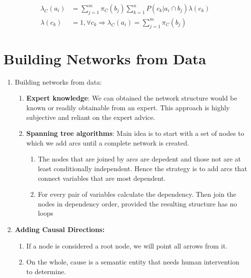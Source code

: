 \documentclass[12pt,twoside]{article}
\begin{document}
\begin{enumerate}
\begin{itemize}
\begin{align*}
\lambda_C(a_i)& = \sum_{j=1}^m \pi_C (b_j) \sum_{k=1}^n P(c_k \vert a_i \cap b_j) \lambda(c_k)\\
\lambda(c_k) & = 1, \forall c_k \Rightarrow \lambda_C(a_i) = \sum_{j=1}^m \pi_C (b_j) 
\end{align*}
\end{itemize}

\end{enumerate}

\newpage

\section{Building Networks from Data}

\begin{enumerate}
\item Building networks from data:
\begin{enumerate}
\item \textbf{Expert knowledge}: We can obtained the network structure would be known or readily obtainable from an expert. This approach is highly subjective and reliant on the expert advice.
\item \textbf{Spanning tree algorithms}: Main idea is to start with a set of nodes to which we add arcs until a complete network is created.
\begin{enumerate}
\item The nodes that are joined by arcs are depedent and those not are at least conditionally independent. Hence the strategy is to add arcs that connect variables that are most dependent.
\item For every pair of variables calculate the dependency. Then join the nodes in dependency order, provided the resulting structure has no loops
\end{enumerate}
\end{enumerate}

\item \textbf{Adding Causal Directions:}
\begin{enumerate}
\item If a node is considered a root node, we will point all arrows from it. 
\item On the whole, cause is a semantic entity that needs human intervention to determine.
\end{enumerate}



\end{enumerate}
\end{document}
